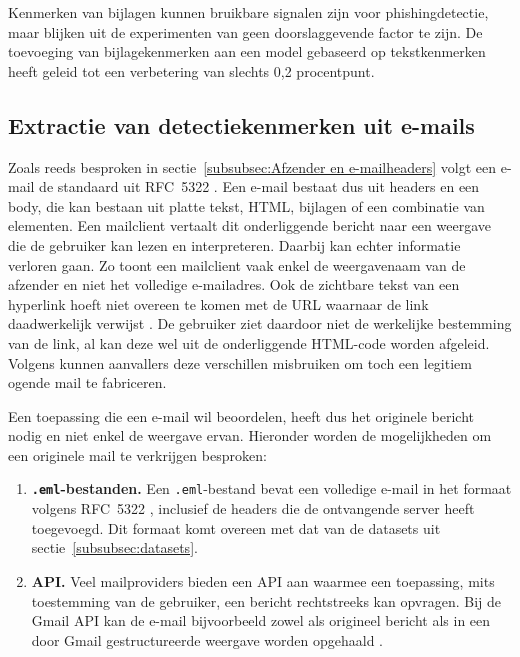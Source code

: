 Kenmerken van bijlagen kunnen bruikbare signalen zijn voor phishingdetectie, maar blijken uit de experimenten van \textcite{Mendes2025} geen doorslaggevende factor te zijn. De toevoeging van bijlagekenmerken aan een model gebaseerd op tekstkenmerken heeft geleid tot een verbetering van slechts 0,2 procentpunt.

\subsection{Extractie van detectiekenmerken uit e-mails}
\label{subsec:extractie-van-detectiekenmerken}

Zoals reeds besproken in sectie~\ref{subsubsec:Afzender en e-mailheaders} volgt een e-mail de standaard uit RFC~5322 \autocite{Resnick2008}. Een e-mail bestaat dus uit headers en een body, die kan bestaan uit platte tekst, HTML, bijlagen of een combinatie van elementen. Een mailclient vertaalt dit onderliggende bericht naar een weergave die de gebruiker kan lezen en interpreteren. Daarbij kan echter informatie verloren gaan. Zo toont een mailclient vaak enkel de weergavenaam van de afzender en niet het volledige e-mailadres. Ook de zichtbare tekst van een hyperlink hoeft niet overeen te komen met de URL waarnaar de link daadwerkelijk verwijst \autocite{Veit2025}. De gebruiker ziet daardoor niet de werkelijke bestemming van de link, al kan deze wel uit de onderliggende HTML-code worden afgeleid. Volgens \textcite{Chen2020} kunnen aanvallers deze verschillen misbruiken om toch een legitiem ogende mail te fabriceren.

Een toepassing die een e-mail wil beoordelen, heeft dus het originele bericht nodig en niet enkel de weergave ervan. Hieronder worden de mogelijkheden om een originele mail te verkrijgen besproken:

\begin{enumerate}
    \item \textbf{\texttt{.eml}-bestanden.} Een \texttt{.eml}-bestand bevat een volledige e-mail in het formaat volgens RFC~5322 \parencite{Resnick2008}, inclusief de headers die de ontvangende server heeft toegevoegd. Dit formaat komt overeen met dat van de datasets uit sectie~\ref{subsubsec:datasets}.
    \item \textbf{API.} Veel mailproviders bieden een API aan waarmee een toepassing, mits toestemming van de gebruiker, een bericht rechtstreeks kan opvragen. Bij de Gmail API kan de e-mail bijvoorbeeld zowel als origineel bericht als in een door Gmail gestructureerde weergave worden opgehaald .
\end{enumerate}

